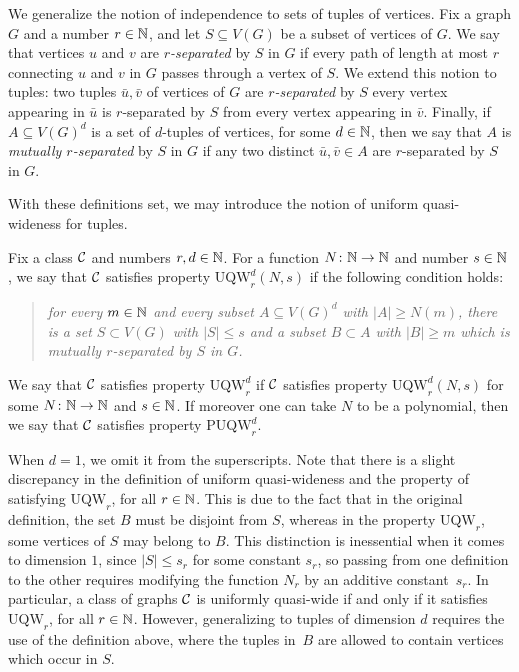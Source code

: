 We generalize the notion of independence to sets of tuples of vertices.
Fix a graph $G$ and a number $r\in \N$, and let $S\subseteq V(G)$ be a subset of vertices of $G$.
We say that vertices $u$ and $v$ are {\em{$r$-separated}} by $S$ in $G$ if every path of length at most $r$ connecting $u$ and $v$ in $G$ passes through a vertex of $S$.
We extend this notion to tuples:
two tuples $\bar u,\bar v$ of vertices of $G$ are \emph{$r$-separated} by $S$ every vertex appearing in $\bar u$ is $r$-separated by $S$ from every vertex appearing in $\bar{v}$.
Finally, if $A\subseteq V(G)^d$ is a set of $d$-tuples of vertices, for some $d\in\N$,
then we say that $A$ is \emph{mutually $r$-separated} by $S$ in $G$ 
if any two distinct $\bar u,\bar v\in A$ are $r$-separated by $S$ in $G$.

\newcommand{\uqw}{\mathrm{UQW}}
\newcommand{\puqw}{\mathrm{PUQW}}
With these definitions set, we may introduce the notion of uniform quasi-wideness for tuples.

\begin{definition}
Fix a class $\cal C$ and numbers $r,d\in\N$.
For a function $N\from\N\to\N$
and number $s\in\N$,
we say that $\cal C$ satisfies property
$\uqw^d_r(N,s)$ if the following condition holds:
   \begin{quote}\itshape 
      for every $m\in \N$ and every subset 
     $A\subseteq V(G)^d$ with $|A|\ge N(m)$, there is a set $S\subset V(G)$ with $|S|\le s$ and a subset $B\subset A$ with $|B|\ge m$ which is mutually $r$-separated by $S$ in $G$.
   \end{quote}   
    We say that $\cal C$ satisfies property $\uqw^d_r$ if  $\cal C$ satisfies property $\uqw^d_r(N,s)$ for 
	some $N\from\N\to\N$ and $s\in\N$.
	If moreover one can take $N$ to be a polynomial,
	then we say that $\cal C$ satisfies property $\puqw^d_r$.
\end{definition}

When $d=1$, we omit it from the superscripts.
  Note that there is a slight discrepancy 
  in the definition of uniform quasi-wideness 
  and the property of satisfying $\uqw_r$, for all $r\in \N$.
  This is due to the fact that in the original definition,
  the set $B$ must be disjoint from $S$,
  whereas in the property $\uqw_r$, 
  some vertices of $S$ may belong to $B$. This distinction is inessential when it comes to dimension $1$, since $|S|\le s_r$ for some constant $s_r$,
  so passing from one definition to the other requires 
  modifying the function $N_r$ by an additive constant~$s_r$.
In particular, a class of graphs $\cal C$ is uniformly quasi-wide if and only if it 
	satisfies $\uqw_r$, for all $r\in \N$.  
  However, generalizing to tuples of dimension $d$ requires the use of the definition above, where the tuples in~$B$ are allowed to contain  vertices which occur in $S$. 
  
